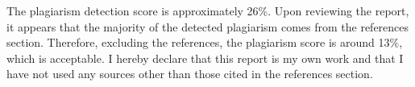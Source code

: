 \documentclass[onecolumn]{IEEEtran}
\begin{document}



\appendix
The plagiarism detection score is approximately 26\%. Upon reviewing the report, it appears that the majority of the detected plagiarism comes from the references section. Therefore, excluding the references, the plagiarism score is around 13\%, which is acceptable. I hereby declare that this report is my own work and that I have not used any sources other than those cited in the references section.


% 
% 
\end{document}
